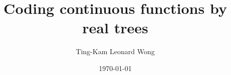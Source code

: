 \documentclass[12pt,oneside]{amsart}
\theoremstyle{plain}
\theoremstyle{definition}
\theoremstyle{remark}
\begin{document}
%



   \author{Ting-Kam Leonard Wong}
   \address{University of Washington, Seattle, United States}



   \title[Real Trees]{Coding continuous functions by real trees}


%





   \date{\today}


   \maketitle


\end{document}
